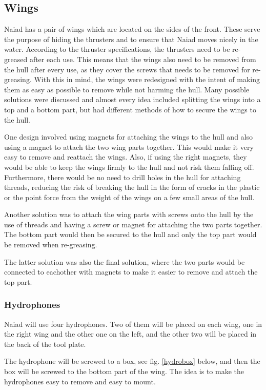 \subsection{Wings} %
\noindent Naiad has a pair of wings which are located on the sides of the front. These serve the purpose of hiding the thrusters and to ensure that Naiad moves nicely in the water. According to the thruster specifications, the thrusters need to be re-greased after each use. This means that the wings also need to be removed from the hull after every use, as they cover the screws that needs to be removed for re-greasing. With this in mind, the wings were redesigned with the intent of making them as easy as possible to remove while not harming the hull. Many possible solutions were discussed and almost every idea included splitting the wings into a top and a bottom part, but had different methods of how to secure the wings to the hull. 

One design involved using magnets for attaching the wings to the hull and also using a magnet to attach the two wing parts together. This would make it very easy to remove and reattach the wings. Also, if using the right magnets, they would be able to keep the wings firmly to the hull and not risk them falling off. Furthermore, there would be no need to drill holes in the hull for attaching threads, reducing the risk of breaking the hull in the form of cracks in the plastic or the point force from the weight of the wings on a few small areas of the hull. 

Another solution was to attach the wing parts with screws onto the hull by the use of threads and having a screw or magnet for attaching the two parts together. The bottom part would then be secured to the hull and only the top part would be removed when re-greasing.

 The latter solution was also the final solution, where the two parts would be connected to eachother with magnets to make it easier to remove and attach the top part.

	\subsubsection{Hydrophones}

Naiad will use four hydrophones. Two of them will be placed on each wing, one in the right wing and the other one on the left, and the other two will be placed in the back of the tool plate. 

The hydrophone will be screwed to a box, see fig. \ref{hydrobox} below, and then the box will be screwed to the bottom part of the wing. The idea is to make the hydrophones easy to remove and easy to mount. 

